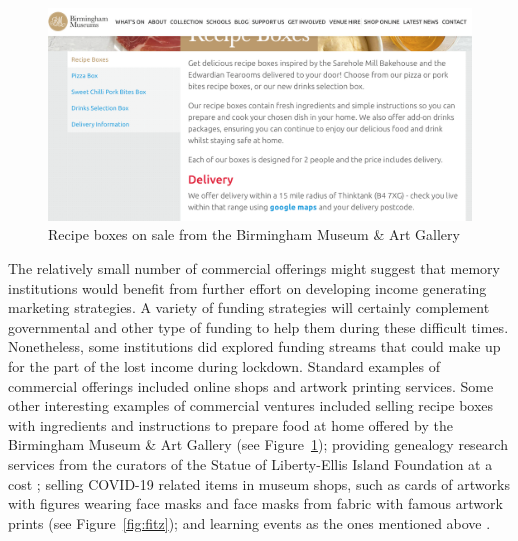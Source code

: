 \documentclass{egpubl}
\begin{document}
\begin{figure}[h]
  \centering
  \includegraphics[width=\linewidth]{images/recipebox.png}
  \caption{\label{fig:recipe}
            Recipe boxes on sale from the Birmingham Museum \& Art Gallery}
\end{figure}

The relatively small number of commercial offerings might suggest that memory institutions would benefit from further effort on developing income generating marketing strategies. A variety of funding strategies will certainly complement governmental and other type of funding to help them during these difficult times. Nonetheless, some institutions did explored funding streams that could make up for the part of the lost income during lockdown. Standard examples of commercial offerings included online shops and artwork printing services. Some other interesting examples of commercial ventures included selling recipe boxes with ingredients and instructions to prepare food at home offered by the Birmingham Museum \& Art Gallery \cite{BirminghamMuseumArtGallery} (see Figure~\ref{fig:recipe}); providing genealogy research services from the curators of the Statue of Liberty-Ellis Island Foundation at a cost \cite{StatueofLiberty-EllisIslandFoundation2020}; selling COVID-19 related items in museum shops, such as cards of artworks with figures wearing face masks and face masks from fabric with famous artwork prints \cite{DetroitInstituteofArts2020,FitzwilliamMuseum2020} (see Figure~\ref{fig:fitz}); and learning events as the ones mentioned above \cite{Fieldmuseum,CaliforniaScienCenter2020}. 
\end{document}
